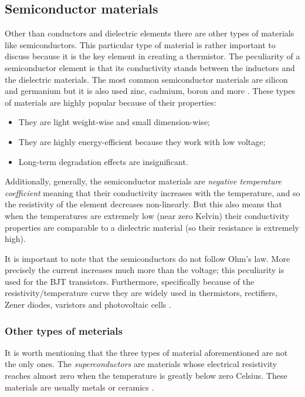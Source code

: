 \subsection{Semiconductor materials}
Other than conductors and dielectric elements there are other types of materials like semiconductors. This particular type of material is rather important to discuss because it is the key element in creating a thermistor. The peculiarity of a semiconductor element is that its conductivity stands between the inductors and the dielectric materials. The most common semiconductor materials are silicon and germanium but it is also used zinc, cadmium, boron and more \cite{Gupta20163}. These types of materials are highly popular because of their properties:
\vspace{-5px}\begin{itemize}
\renewcommand*{\labelitemi}{$\circ$}
\setlength{\itemsep}{-2px}
    \item They are light weight-wise and small dimension-wise;
    \item They are highly energy-efficient because they work with low voltage;
    \item Long-term degradation effects are insignificant.
\end{itemize}

\noindent Additionally, generally, the semiconductor materials are \textsl{negative temperature coefficient} meaning that their conductivity increases with the temperature, and so the resistivity of the element decreases non-linearly. But this also means that when the temperatures are extremely low (near zero Kelvin) their conductivity properties are comparable to a dielectric material (so their resistance is extremely high).

It is important to note that the semiconductors do not follow Ohm's law. More precisely the current increases much more than the voltage; this peculiarity is used for the BJT transistors. Furthermore, specifically because of the resistivity/temperature curve they are widely used in thermistors, rectifiers, Zener diodes, varistors and photovoltaic cells \cite{Gupta20163}.


\subsubsection*{Other types of meterials}
It is worth mentioning that the three types of material aforementioned are not the only ones. The \textsl{superconductors} are materials whose electrical resistivity reaches almost zero when the temperature is greatly below zero Celsius. These materials are usually metals or ceramics \cite{Gupta20163}.

